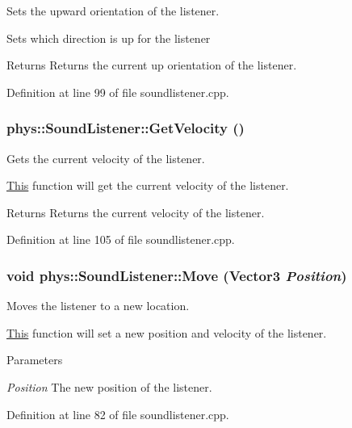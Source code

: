 Sets the upward orientation of the listener. 

Sets which direction is up for the listener \begin{DoxyReturn}{Returns}
Returns the current up orientation of the listener. 
\end{DoxyReturn}


Definition at line 99 of file soundlistener.cpp.

\hypertarget{classphys_1_1SoundListener_a6b4bbf974c48ba2028bcf2f943a1b1c2}{
\subsubsection[{GetVelocity}]{ phys::SoundListener::GetVelocity ()}}
\label{d1/d5a/classphys_1_1SoundListener_a6b4bbf974c48ba2028bcf2f943a1b1c2}


Gets the current velocity of the listener. 

\hyperlink{structThis}{This} function will get the current velocity of the listener. \begin{DoxyReturn}{Returns}
Returns the current velocity of the listener. 
\end{DoxyReturn}


Definition at line 105 of file soundlistener.cpp.

\hypertarget{classphys_1_1SoundListener_a6fb5a26760d0ec460271393fd493dda2}{
\subsubsection[{Move}]{\setlength{\rightskip}{0pt plus 5cm}void phys::SoundListener::Move ({\bf Vector3} {\em Position})}}
\label{d1/d5a/classphys_1_1SoundListener_a6fb5a26760d0ec460271393fd493dda2}


Moves the listener to a new location. 

\hyperlink{structThis}{This} function will set a new position and velocity of the listener. 
\begin{DoxyParams}{Parameters}
\item[{\em Position}]The new position of the listener. \end{DoxyParams}


Definition at line 82 of file soundlistener.cpp.

